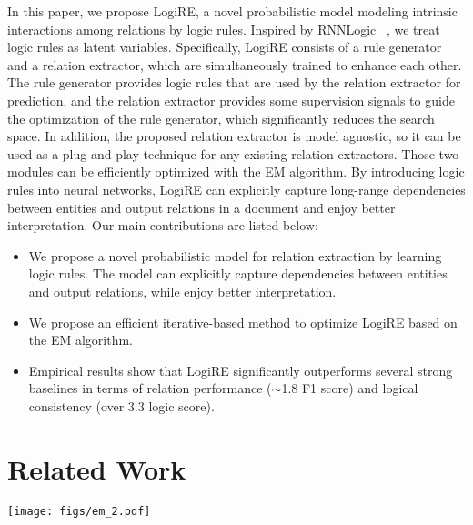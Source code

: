\documentclass[11pt]{article}
\newcommand{\mymodel}{LogiRE\xspace}
\begin{document}
In this paper, we propose \mymodel, a novel probabilistic model modeling intrinsic interactions among relations by logic rules.
Inspired by RNNLogic ~\cite{qu2020rnnlogic},
we treat logic rules as latent variables.
Specifically,
\mymodel consists of a rule generator and a relation extractor,
which are simultaneously trained to enhance each other.
The rule generator provides logic rules that are used by the relation extractor for prediction, 
and the relation extractor provides some supervision signals to guide the optimization of the rule generator, which significantly reduces the search space.
In addition, the proposed relation extractor is model agnostic, so it can be used as a plug-and-play technique for any existing relation extractors.
Those two modules can be efficiently optimized with the EM algorithm.
By introducing logic rules into neural networks, 
\mymodel can explicitly capture long-range dependencies between entities and output relations in a document and enjoy better interpretation.
Our main contributions are listed below:
\begin{itemize}[leftmargin=1pt, itemindent=1pc]
    \item We propose a novel probabilistic model for relation extraction by learning logic rules.
    The model can explicitly capture dependencies between entities and output relations, while enjoy better interpretation.
    \item We propose an efficient iterative-based method to optimize \mymodel based on the EM algorithm.
    \item Empirical results show that \mymodel significantly outperforms several strong baselines in terms of relation performance ($\sim$1.8 F1 score) and logical consistency (over 3.3 logic score).
\end{itemize}














 
\section{Related Work}
\label{sec:related}
\begin{figure*}
    \centering
    \texttt{[image: figs/em\_2.pdf]}
    \caption{The overview of \mymodel. \mymodel consists of two modules: a rule generator $p_\theta$ and a relation extractor $p_w$. For a given document $\mathcal{D}$ and a query triple $q$, we treat the required logic rules as latent variables $\bm{z}$, aiming to identify the corresponding truth value $y$. During \textcolor{myblue}{inference}, we sample from the rule generator for the latent rule set and use the relation extractor to predict $y$ given the rules. The overall objective (maximizing the likelihood) is optimized by the EM algorithm. In the \textcolor{myred}{E-step}, we estimate the approximate posterior $q(\bm{z})$; In the \textcolor{mygreen}{M-step}, we maximize a lower bound of the likelihood w.r.t. $\theta, w$.}
    \label{fig:overview}
\end{figure*}
\end{document}
